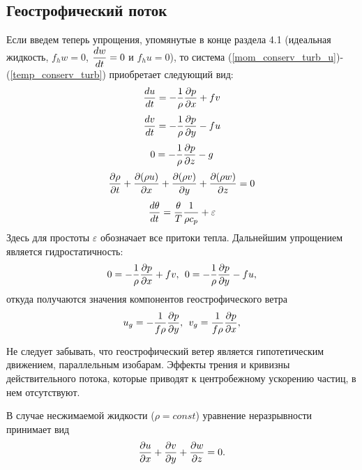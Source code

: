 \subsection{{\color{done}Геострофический поток}}
    Если введем теперь упрощения, упомянутые в конце раздела 4.1 (идеальная жидкость, $f_h w = 0$, $\displaystyle\frac{d w}{d t}=0$ и $f_h u = 0$), то система (\ref{mom_conserv_turb_u})-(\ref{temp_conserv_turb}) приобретает следующий вид:
    \begin{equation}
    \label{eq:DuDt_geost}
        \displaystyle\frac{d u}{d t} = -\frac{1}{\rho}\displaystyle\frac{\partial p}{\partial x}+fv 
    \end{equation} 
    \begin{equation}
    \label{eq:DvDt_geost}
        \displaystyle\frac{d v}{d t} = -\frac{1}{\rho}\displaystyle\frac{\partial p}{\partial y}-fu 
    \end{equation} 
    \begin{equation}
        0 = -\frac{1}{\rho}\displaystyle\frac{\partial p}{\partial z}-g 
    \end{equation} 
    \begin{equation}
        \displaystyle\frac{\partial \rho}{\partial t} + \displaystyle\frac{\partial (\rho u)}{\partial x} + \displaystyle\frac{\partial (\rho v)}{\partial y} + \displaystyle\frac{\partial (\rho w)}{\partial z} = 0 
    \end{equation} 
    \begin{equation}
    \label{eq:DthetaDt}
        \displaystyle\frac{d \theta}{d t} = \frac{\theta}{T} \frac{1}{\rho c_p} + \varepsilon
    \end{equation} 
    Здесь для простоты $\varepsilon$  обозначает все притоки тепла. Дальнейшим упрощением является гидростатичность:
    \begin{equation}
        0 = -\frac{1}{\rho}\displaystyle\frac{\partial p}{\partial x}+fv, \:\: 0 = -\frac{1}{\rho}\displaystyle\frac{\partial p}{\partial y}-fu,  
    \end{equation} 
    откуда получаются значения компонентов геострофического ветра 
    \begin{equation}
        u_g = -\frac{1}{f \rho}\displaystyle\frac{\partial p}{\partial y}, \:\: v_g = \frac{1}{f \rho}\displaystyle\frac{\partial p}{\partial x},  
    \end{equation} 
    \begin{info}
    Не следует забывать, что геострофический ветер является гипотетическим движением, параллельным  изобарам. Эффекты трения и кривизны действительного потока, которые приводят к центробежному ускорению частиц, в нем отсутствуют.
    \end{info}

    В случае несжимаемой жидкости ($\rho=const$) уравнение неразрывности принимает вид
    \begin{equation}
        \displaystyle\frac{\partial u}{\partial x}+\displaystyle\frac{\partial v}{\partial y}+\displaystyle\frac{\partial w}{\partial z}=0.  
    \end{equation} 

